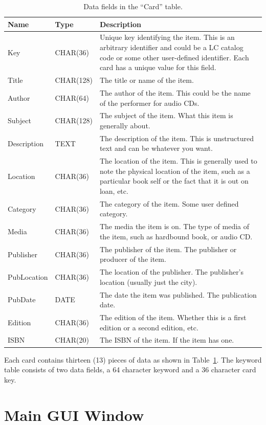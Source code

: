 \begin{table}[hpt]
\begin{tabular}{|l|l|p{3in}|}
\hline
Name&Type&Description \\
\hline
Key&CHAR(36)&Unique key identifying the item. This is an arbitrary
identifier and could be a LC catalog code or some other user-defined
identifier.  Each card has a unique value for this field.\\
Title&CHAR(128)&The title or name of the item.\\
Author&CHAR(64)&The author of the item. This could be the name of the
performer for audio CDs.\\
Subject&CHAR(128)&The subject of the item.  What this item is generally
about. \\
Description&TEXT&The description of the item.  This is unstructured text
and can be whatever you want.\\
Location&CHAR(36)&The location of the item. This is generally used to
note the physical location of the item, such as a particular book self
or the fact that it is out on loan, etc.\\
Category&CHAR(36)&The category of the item. Some user defined category.\\
Media&CHAR(36)&The media the item is on. The type of media of the item,
such as hardbound book, or audio CD.\\
Publisher&CHAR(36)&The publisher of the item. The publisher or producer
of the item.\\
PubLocation&CHAR(36)&The location of the publisher. The publisher's
location (usually just the city).\\
PubDate&DATE&The date the item was published. The publication date.\\
Edition&CHAR(36)&The edition of the item. Whether this is a first
edition or a second edition, etc.\\
ISBN&CHAR(20)&The ISBN of the item. If the item has one.\\
\hline
\end{tabular}
\caption{Data fields in the ``Card'' table.}
\label{tab:ref:cardfields}
\end{table}
Each card contains thirteen (13) pieces of data as shown in
Table~\ref{tab:ref:cardfields}. The keyword table consists of two data
fields, a 64 character keyword and a 36 character card key.

\section{Main GUI Window}

